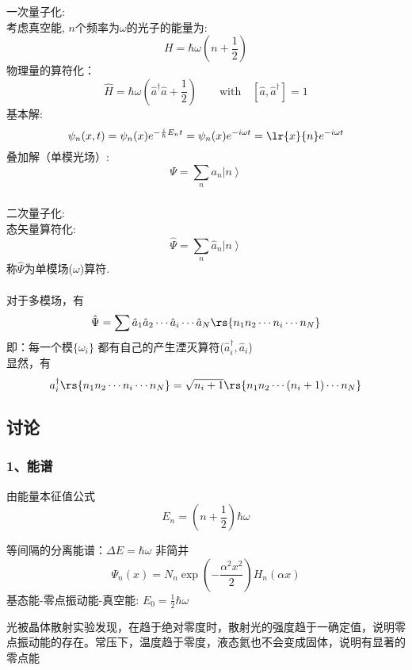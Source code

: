 \begin{frame} \frametitle{}
{\Bullet}一次量子化:\\
考虑真空能, $n$个频率为$\omega$的光子的能量为:
\[ H = \hbar \omega \left( n + \frac{1 }{2}\right)\]
物理量的算符化：
\[  \hat{H}= \hbar \omega \left(\hat{a}^\dagger \hat{a} + \frac{1 }{2}\right) \qquad \text{with} \quad [\hat{a},\hat{a}^\dagger]=1 \]
基本解:
\[ \psi_n(x,t) = \psi_n(x)e^{-\frac{i}{\hbar} E_n t } =\psi_n(x)e^{-i \omega t } = \lr{x}{n}e^{-i \omega t }\]  
叠加解（单模光场）:
\[ \Psi = \sum_n a_n \left\vert n \right\rangle\] 
\end{frame}

\begin{frame} 
\frametitle{}
{\Bullet}二次量子化: \\
态矢量算符化:
\[ \hat{\Psi} = \sum_n \hat{a}_n \left\vert n \right\rangle\]
称$\hat{\Psi}$为单模场($\omega$)算符. \\ 
~~\\    
对于多模场，有 
\[\hat{\Psi} = \sum \hat{a}_1\hat{a}_2\cdots\hat{a}_i\cdots \hat{a}_N \rs{n_1n_2\cdots  n_i \cdots n_N }\]
即：每一个模$\{ \omega_i \}$ 都有自己的产生湮灭算符($\hat{a}^{\dagger} _{i}, \hat{a}_{i}$)\\
显然，有 
\[ a^{\dagger} _{i}\rs{n_1n_2\cdots  n_i \cdots n_N }= \sqrt{n_i +1} \rs{n_1n_2\cdots  (n_i+1) \cdots n_N }\]
\end{frame}

\subsection{讨论}

\begin{frame}
  \frametitle{ 1、能谱}
  由能量本征值公式
  \[E_n = \left(n+\frac{1}{2}\right)\hbar\omega \]
  \begin{itemize}
    \Item 等间隔的分离能谱：$\Delta E = \hbar\omega $
    \Item 非简并 \begin{equation*}
        \Psi_n(x) = N_n  \exp(-\frac{ \alpha^2 x^2}{2}) H_n( \alpha x) 
    \end{equation*}
    \Item 基态能-零点振动能-真空能: $E_0 = \frac{1}{2}\hbar\omega $
  \end{itemize}
  \emf[实验事实:] 光被晶体散射实验发现，在趋于绝对零度时，散射光的强度趋于一确定值，说明零点振动能的存在。常压下，温度趋于零度，液态氦也不会变成固体，说明有显著的零点能 
\end{frame}

